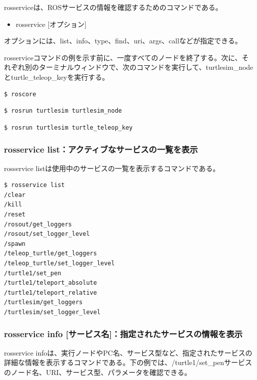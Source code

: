rosserviceは、ROSサービスの情報を確認するためのコマンドである。

\begin{itemize}
\item rosservice [オプション]
\end{itemize}

オプションには、list、info、type、find、uri、args、callなどが指定できる。

rosserviceコマンドの例を示す前に、一度すべてのノードを終了する。次に、それぞれ別のターミナルウィンドウで、次のコマンドを実行して、turtlesim\_nodeとturtle\_teleop\_keyを実行する。

\begin{lstlisting}[language=ROS]
$ roscore
\end{lstlisting}

\begin{lstlisting}[language=ROS]
$ rosrun turtlesim turtlesim_node
\end{lstlisting}

\begin{lstlisting}[language=ROS]
$ rosrun turtlesim turtle_teleop_key
\end{lstlisting}

\subsubsection{rosservice list：アクティブなサービスの一覧を表示}

rosservice listは使用中のサービスの一覧を表示するコマンドである。

\begin{lstlisting}[language=ROS]
$ rosservice list
/clear
/kill
/reset
/rosout/get_loggers
/rosout/set_logger_level
/spawn
/teleop_turtle/get_loggers
/teleop_turtle/set_logger_level
/turtle1/set_pen
/turtle1/teleport_absolute
/turtle1/teleport_relative
/turtlesim/get_loggers
/turtlesim/set_logger_level
\end{lstlisting}

\subsubsection{rosservice info [サービス名]：指定されたサービスの情報を表示}

rosservice infoは、実行ノードやPC名、サービス型など、指定されたサービスの詳細な情報を表示するコマンドである。下の例では、/turtle1/set\_penサービスのノード名、URI、サービス型、パラメータを確認できる。

